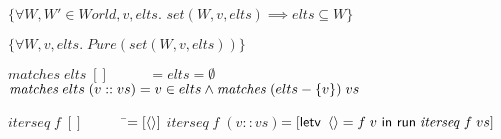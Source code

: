 \documentclass[natbib]{sigplanconf}
\begin{document}
{\begin{specification}
$\{\forall W, W' \in World, v, elts.$ \nextline
\>$set(W, v, elts) \implies elts \subseteq W\}$ \specand \nextline[0.5em]

$\{\forall W, v, elts.\; \mathit{Pure}(set(W,v,elts))\}$ \nextline[0.5em]
  

$\mathit{matches}\;elts\;[] \qquad\;\;\; = elts = \emptyset$ \nextline
$\mathit{matches}\;elts\;(v :: vs) = v \in elts \land \mathit{matches}\;(elts - \{{v}\})\;vs$ \nextline[0.5em]

$\mathit{iterseq}\; f\; [] \qquad\;\;\;\;$\=$= [\left<\right>]$ \nextline
$\mathit{iterseq}\; f\; (v :: vs)$\>$= [\mbox{\textsf{{letv }}}\left<\right> = f\;v\mbox{\textsf{{ in }}}\mbox{\textsf{{run}}}\;\mathit{iterseq}\;f\;vs]$ 
\end{specification}
}
\end{document}
